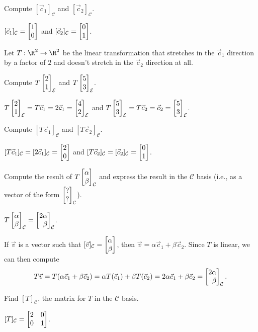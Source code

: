 	\begin{parts}
		\item Compute $[\vec c_1]_{\mathcal C}$ and $[\vec c_2]_{\mathcal C}$.
			\begin{solution}[inline]
				$[\vec c_1]_{\mathcal C}=\mat{1\\0}$ and
				$[\vec c_2]_{\mathcal C}=\mat{0\\1}$.
			\end{solution}
	\end{parts}
	Let $T:\R^2\to\R^2$ be the linear transformation that stretches in the $\vec c_1$ direction by a factor of $2$
	and doesn't stretch in the $\vec c_2$ direction at all.
	\begin{parts}[resume]
		\item Compute $T\mat{2\\1}_{\mathcal E}$ and $T\mat{5\\3}_{\mathcal E}$.
			\begin{solution}[inline]
				$T\mat{2\\1}_{\mathcal E}=T\vec c_1=2\vec c_1=\mat{4\\2}_{\mathcal E}$ and
				$T\mat{5\\3}_{\mathcal E}=T\vec c_2=\vec c_2=\mat{5\\3}_{\mathcal E}$.
			\end{solution}
		\item Compute $[T\vec c_1]_{\mathcal C}$ and $[T\vec c_2]_{\mathcal C}$.
			\begin{solution}[inline]
				$[T\vec c_1]_{\mathcal C}=[2\vec c_1]_{\mathcal C}=\mat{2\\0}$ and
				$[T\vec c_2]_{\mathcal C}=[\vec c_2]_{\mathcal C}=\mat{0\\1}$.
			\end{solution}
		\item Compute the result of $T\mat{\alpha\\\beta}_{\mathcal C}$ and express the result in the
			$\mathcal C$ basis (i.e., as a vector of the form $\mat{?\\?}_{\mathcal C}$).
			\begin{solution}
				$T\mat{\alpha\\\beta}_{\mathcal C}=\mat{2\alpha\\\beta}_{\mathcal C}$.

				If $\vec v$ is a vector such that
				$[\vec v]_{\mathcal C}=\mat{\alpha\\\beta}$, then
				$\vec v=\alpha\vec c_1+\beta\vec c_2$. Since $T$ is linear, we can
				then compute
				\[
					T\vec v
					=T(\alpha\vec c_1+\beta\vec c_2)
					=\alpha T(\vec c_1)+\beta T(\vec c_2)
					=2\alpha\vec c_1+\beta\vec c_2
					=\mat{2\alpha\\\beta}_{\mathcal C}.
				\]
			\end{solution}
		\item Find $[T]_{\mathcal C}$, the matrix for $T$ in the $\mathcal C$ basis.
			\begin{solution}
				$[T]_{\mathcal C}=\mat{2&0\\0&1}$.


\end{solution}
\end{parts}
